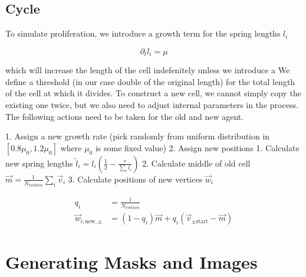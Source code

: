 \documentclass{article}
\begin{document}

\subsection{Cycle}

To simulate proliferation, we introduce a growth term for the spring lengths $l_i$

\begin{equation}
    \partial_t l_i = \mu
    \label{growth-ode}
\end{equation}

which will increase the length of the cell indefenitely unless we introduce a
We define a threshold (in our case double of the original length) for the total length of the
cell at which it divides.
To construct a new cell, we cannot simply copy the existing one twice, but we also need to adjust
internal parameters in the process.
The following actions need to be taken for the old and new agent.


1. Assign a new growth rate (pick randomly from uniform distribution in $[0.8\mu_0,1.2\mu_0]$
   where $\mu_0$ is some fixed value)
2. Assign new positions
    1. Calculate new spring lengths
        $\tilde{l}_i = l_i\left(\frac{1}{2} - \frac{r}{\sum\limits_i l_i}\right)$
    2. Calculate middle of old cell
        $\vec{m} = \frac{1}{N_\text{vertices}}\sum\limits_i\vec{v}_i$
    3. Calculate positions of new vertices $\vec{w}_i$

\begin{align}
    q_i &= \frac{i}{N_\text{vertices}}\\
    \vec{w}_{i,\text{new},\pm} &= (1-q_i)\vec{m} + q_i(\vec{v}_{\pm\text{start}} - \vec{m})
\end{align}

\section{Generating Masks and Images}
\label{section:generating-masks-and-images}
\end{document}
